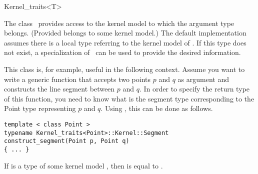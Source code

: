 \begin{ccRefClass}{Kernel_traits<T>}

\ccDefinition

The class \ccClassTemplateName\ provides access to the kernel model to
which the argument type  belongs. (Provided  belongs to
some kernel model.)  The default implementation assumes there is a
local type  referring to the kernel model of .
If this type does not exist, a specialization of \ccRefName\ can be
used to provide the desired information.

This class is, for example, useful in the following context. Assume
you want to write a generic function that accepts two points $p$ and
$q$ as argument and constructs the line segment between $p$ and $q$.
In order to specify the return type of this function, you need to know
what is the segment type corresponding to the Point type representing
$p$ and $q$. Using \ccRefName, this can be done as follows.
\begin{verbatim}
template < class Point >
typename Kernel_traits<Point>::Kernel::Segment
construct_segment(Point p, Point q)
{ ... } 
\end{verbatim}


\ccTypes

 { If  is a type
   of some kernel model , then  is
  equal to . }

\ccTexHtml{\KernelRefLayout}{}
\end{ccRefClass}

